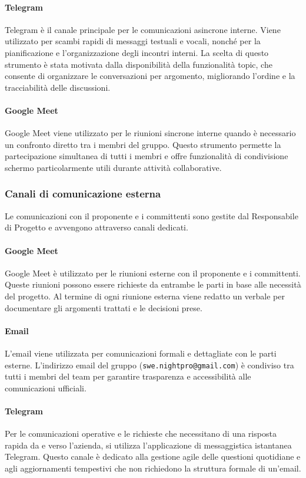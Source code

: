\documentclass[a4paper, 11pt, oneside]{scrartcl} %
\begin{document}
\paragraph{Telegram}
Telegram è il canale principale per le comunicazioni asincrone interne.
Viene utilizzato per scambi rapidi di messaggi testuali e vocali, nonché per la pianificazione e l'organizzazione degli incontri interni.
La scelta di questo strumento è stata motivata dalla disponibilità della funzionalità topic, che consente di organizzare le conversazioni per argomento, migliorando l'ordine e la tracciabilità delle discussioni.

\paragraph{Google Meet}
Google Meet viene utilizzato per le riunioni sincrone interne quando è necessario un confronto diretto tra i membri del gruppo.
Questo strumento permette la partecipazione simultanea di tutti i membri e offre funzionalità di condivisione schermo particolarmente utili durante attività collaborative.

\subsubsection{Canali di comunicazione esterna}
Le comunicazioni con il proponente e i committenti sono gestite dal Responsabile di Progetto e avvengono attraverso canali dedicati.

\paragraph{Google Meet}
Google Meet è utilizzato per le riunioni esterne con il proponente e i committenti.
Queste riunioni possono essere richieste da entrambe le parti in base alle necessità del progetto.
Al termine di ogni riunione esterna viene redatto un verbale per documentare gli argomenti trattati e le decisioni prese.

\paragraph{Email}
L'email viene utilizzata per comunicazioni formali e dettagliate con le parti esterne.
L'indirizzo email del gruppo (\texttt{swe.nightpro@gmail.com}) è condiviso tra tutti i membri del team per garantire trasparenza e accessibilità alle comunicazioni ufficiali.
\paragraph{Telegram} Per le comunicazioni operative e le richieste che necessitano di una risposta rapida da e verso l'azienda, si utilizza l'applicazione di messaggistica istantanea Telegram. Questo canale è dedicato alla gestione agile{\scriptsize{}} delle questioni quotidiane e agli aggiornamenti tempestivi che non richiedono la struttura formale di un'email.
\end{document}
